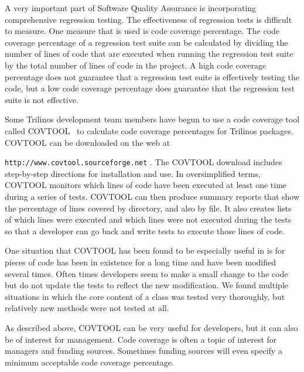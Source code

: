 \documentclass[12pt,relax]{article}
\newcommand{\InlineDirectory}[1]{
  {\hspace{0.01 in}} {\tt #1} {\hspace{0.01 in}}}
\begin{document}
A very important part of Software Quality Assurance is incorporating 
comprehensive regression testing.  The effectiveness of regression tests is 
difficult to measure.  One measure that is used is code coverage percentage.  
The code coverage percentage of a regression test suite can be calculated by 
dividing the number of lines of code that are executed when running the 
regression test suite by the total number of lines of code in the project.
A high code coverage percentage does not guarantee that a regression test 
suite is effectively testing the code, but a low code coverage percentage does 
guarantee that the regression test suite is not effective.

Some Trilinos development team members have begun to use a code coverage tool 
called COVTOOL~\cite{COVTOOL} to calculate code coverage percentages for 
Trilinos packages.  COVTOOL can be downloaded on the web at \newline
\InlineDirectory{http://www.covtool.sourceforge.net}.  The COVTOOL download 
includes step-by-step directions for installation and use.  In oversimplified
terms, COVTOOL monitors which lines of code have been executed at least one 
time during a series of tests.  COVTOOL can then produce summary reports that 
show the percentage of lines covered by directory, and also by file.  It also 
creates lists of which lines were executed and which lines were not executed 
during the tests so that a developer can go back and write tests to execute 
those lines of code.

One situation that COVTOOL has been found to be especially useful in is for 
pieces of code has been in existence for a long time and have been modified 
several times.  Often times developers seem to make a small change to the code 
but do not update the tests to reflect the new modification.  We found 
multiple situations in which the core content of a class was tested very 
thoroughly, but relatively new methods were not tested at all.

As described above, COVTOOL can be very useful for developers, but it can also
be of interest for management.  Code coverage is often a topic of interest for 
managers and funding sources.  Sometimes funding sources will even specify a 
minimum acceptable code coverage percentage.

\end{document}
